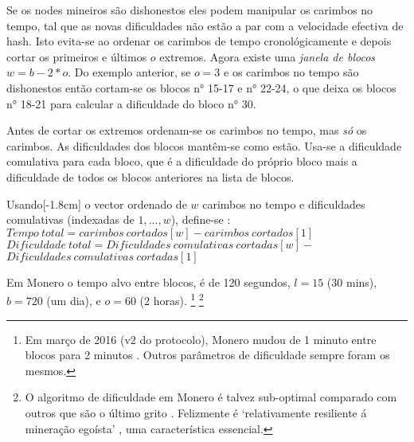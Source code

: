 Se os nodes mineiros são dishonestos eles podem manipular os carimbos no tempo, tal que as novas dificuldades não estão a par com a velocidade efectiva de hash. Isto evita-se ao ordenar os carimbos de tempo cronológicamente e depois cortar os primeiros e últimos $o$ extremos. Agora existe uma {\em janela de blocos} $w = b-2*o$. Do exemplo anterior, se $o = 3$ e os carimbos no tempo são dishonestos então cortam-se os blocos n° 15-17 e n° 22-24, o que deixa os blocos n° 18-21 para calcular a dificuldade do bloco n° 30.

Antes de cortar os extremos ordenam-se os carimbos no tempo, mas {\em só} os carimbos. As dificuldades dos blocos mantêm-se como estão. Usa-se a dificuldade comulativa para cada bloco, que é a dificuldade do próprio bloco mais a dificuldade de todos os blocos anteriores na lista de blocos. 

Usando[-1.8cm] o vector ordenado de $w$ carimbos no tempo e dificuldades comulativas (indexadas de $1,...,w$), define-se :\newline
$\mathit{Tempo\ total} = \mathit{
carimbos\ cortados}[w] - \mathit{carimbos\ cortados}[1]$ \newline
$\mathit{Dificuldade\ total} = \mathit{Dificuldades\ comulativas\ cortadas}[w] -$ \\ $\mathit{Dificuldades\ comulativas\ cortadas}[1]$


Em Monero o tempo alvo entre blocos, é de 120 segundos, $l = 15$ (30 mins), $b = 720$ (um dia), e $o = 60$ (2 horas).
\footnote{Em março de 2016 (v2 do protocolo), Monero mudou de 1 minuto entre blocos para 2 minutos \cite{monero-0.9.3}. Outros parâmetros de dificuldade sempre foram os mesmos.}
\footnote{O algoritmo de dificuldade em Monero é talvez sub-optimal comparado com outros que são o último grito \cite{difficuly-algorithm-summary}. Felizmente é `relativamente resiliente á mineração egoísta' \cite{selfish-miner-profitability-algorithm-analysis}, uma característica essencial.}

